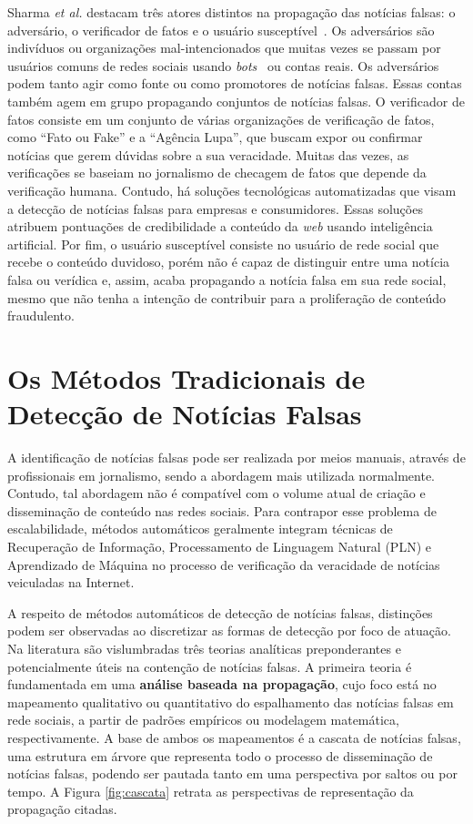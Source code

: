 \documentclass{SBCbookchapter}
\begin{document}
Sharma {\it et al.} destacam três atores distintos na propagação das notícias falsas: o adversário, o verificador de fatos e o usuário susceptível~\cite{sharma2019combating}. Os adversários são indivíduos ou organizações mal-intencionados que muitas vezes se passam por usuários comuns de redes sociais usando {\it bots}~\cite{botOrNot} ou contas reais. Os adversários podem tanto agir como fonte ou como promotores de notícias falsas. Essas contas também agem em grupo propagando conjuntos de notícias falsas. O verificador de fatos consiste em um conjunto de várias organizações de verificação de fatos, como ``Fato ou Fake” e a ``Agência Lupa”,  que buscam expor ou confirmar notícias que gerem dúvidas sobre a sua veracidade. Muitas das vezes, as verificações se baseiam no jornalismo de checagem de fatos que depende da verificação humana. Contudo, há soluções tecnológicas automatizadas que visam a detecção de notícias falsas para empresas e consumidores. Essas soluções atribuem pontuações de credibilidade a conteúdo da {\it web} usando inteligência artificial. Por fim, o usuário susceptível consiste no usuário de rede social que recebe o conteúdo duvidoso, porém não é capaz de distinguir entre uma notícia falsa ou verídica e, assim, acaba propagando a notícia falsa em sua rede social, mesmo que não tenha a intenção de contribuir para a proliferação de conteúdo fraudulento.

\section{Os Métodos Tradicionais de Detecção de Notícias Falsas}
\label{sec:metodos}

A identificação de notícias falsas pode ser realizada por meios manuais, através de profissionais em jornalismo, sendo a abordagem mais utilizada normalmente. Contudo, tal abordagem não é compatível com o volume atual de criação e disseminação de conteúdo nas redes sociais. Para contrapor esse problema de escalabilidade, métodos automáticos geralmente integram técnicas de Recuperação de Informação, Processamento de Linguagem Natural (PLN) e Aprendizado de Máquina no processo de verificação da veracidade de notícias veiculadas na Internet. 

A respeito de métodos automáticos de detecção de notícias falsas, distinções podem ser observadas ao discretizar as formas de detecção por foco de atuação. Na literatura são vislumbradas três teorias analíticas preponderantes e potencialmente úteis na contenção de notícias falsas. A primeira teoria é fundamentada em uma \textbf{análise baseada na propagação}, cujo foco está no mapeamento qualitativo ou quantitativo do espalhamento das notícias falsas em rede sociais, a partir de padrões empíricos ou modelagem matemática, respectivamente. A base de ambos os mapeamentos é a cascata de notícias falsas, uma estrutura em árvore que representa todo o processo de disseminação de notícias falsas, podendo ser pautada tanto em uma perspectiva por saltos ou por tempo. A Figura \ref{fig:cascata} retrata as perspectivas de representação da propagação citadas.
\end{document}
